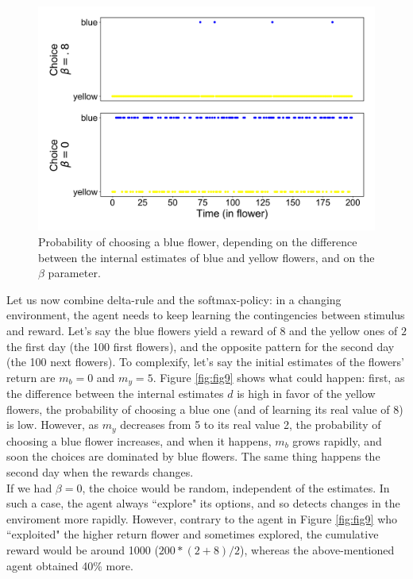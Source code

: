 \documentclass{article}
\begin{document}
\begin{figure}[H]
\centering
\includegraphics[width=.8\linewidth]{fig2_report11.png}
\caption[growing population]{Probability of choosing a blue flower, depending on the difference between the internal estimates of blue and yellow flowers, and on the $\beta$ parameter.}\label{fig:fig8}
\end{figure}

Let us now combine delta-rule and the softmax-policy: in a changing environment, the agent needs to keep learning the contingencies between stimulus and reward. Let's say the blue flowers yield a reward of $8$ and the yellow ones of $2$ the first day (the 100 first flowers), and the opposite pattern for the second day (the 100 next flowers). To complexify, let's say the initial estimates of the flowers' return are $m_b = 0$ and $m_y = 5$. Figure \ref{fig:fig9} shows what could happen: first, as the difference between the internal estimates $d$ is high in favor of the yellow flowers, the probability of choosing a blue one (and of learning its real value of 8) is low. However, as $m_y$ decreases from 5 to its real value 2, the probability of choosing a blue flower increases, and when it happens, $m_b$ grows rapidly, and soon the choices are dominated by blue flowers. The same thing happens the second day when the rewards changes.\\

\indent If we had $\beta = 0$, the choice would be random, independent of the estimates. In such a case, the agent always ``explore" its options, and so detects changes in the enviroment more rapidly. However, contrary to the agent in Figure \ref{fig:fig9} who ``exploited" the higher return flower and sometimes explored, the cumulative reward would be around 1000 ($200*(2+8)/2$), whereas the above-mentioned agent obtained 40\% more.
\end{document}

